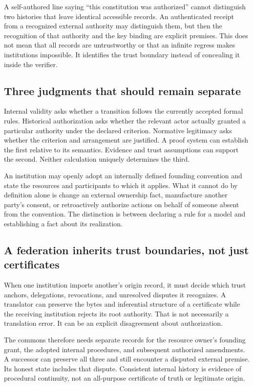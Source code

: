 \documentclass[11pt,letterpaper]{article}
\theoremstyle{plain}
\theoremstyle{definition}
\theoremstyle{remark}
\begin{document}
A self-authored line saying ``this constitution was authorized'' cannot distinguish two histories that leave identical accessible records. An authenticated receipt from a recognized external authority may distinguish them, but then the recognition of that authority and the key binding are explicit premises. This does not mean that all records are untrustworthy or that an infinite regress makes institutions impossible. It identifies the trust boundary instead of concealing it inside the verifier.

\subsection{Three judgments that should remain separate}
Internal validity asks whether a transition follows the currently accepted formal rules. Historical authorization asks whether the relevant actor actually granted a particular authority under the declared criterion. Normative legitimacy asks whether the criterion and arrangement are justified. A proof system can establish the first relative to its semantics. Evidence and trust assumptions can support the second. Neither calculation uniquely determines the third.

An institution may openly adopt an internally defined founding convention and state the resources and participants to which it applies. What it cannot do by definition alone is change an external ownership fact, manufacture another party's consent, or retroactively authorize actions on behalf of someone absent from the convention. The distinction is between declaring a rule for a model and establishing a fact about its realization.

\subsection{A federation inherits trust boundaries, not just certificates}
When one institution imports another's origin record, it must decide which trust anchors, delegations, revocations, and unresolved disputes it recognizes. A translator can preserve the bytes and inferential structure of a certificate while the receiving institution rejects its root authority. That is not necessarily a translation error. It can be an explicit disagreement about authorization.

The commons therefore needs separate records for the resource owner's founding grant, the adopted internal procedures, and subsequent authorized amendments. A successor can preserve all three and still encounter a disputed external premise. Its honest state includes that dispute. Consistent internal history is evidence of procedural continuity, not an all-purpose certificate of truth or legitimate origin.
\end{document}

